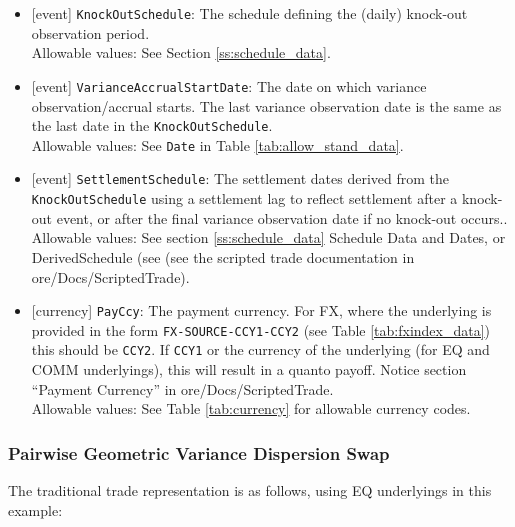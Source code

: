 \begin{itemize}
  The full set of allowable values is given in Table \ref{tab:boolean_allowable}.
  \item{}[event] \lstinline!KnockOutSchedule!: The schedule defining the (daily) knock-out observation period. \\
  Allowable values: See Section \ref{ss:schedule_data}.
  \item{}[event] \lstinline!VarianceAccrualStartDate!: The date on which variance observation/accrual starts. The last variance
  observation date is the same as the last date in the \lstinline!KnockOutSchedule!.  \\
  Allowable values: See \lstinline!Date! in Table \ref{tab:allow_stand_data}.
  \item{}[event] \lstinline!SettlementSchedule!: The settlement dates derived from the \lstinline!KnockOutSchedule! using a
  settlement lag to reflect settlement after a knock-out event, or after the final variance observation date if
  no knock-out occurs.. \\
  Allowable values: See section \ref{ss:schedule_data} Schedule Data and Dates, or DerivedSchedule (see (see the scripted trade
  documentation in ore/Docs/ScriptedTrade).
  \item{}[currency] \lstinline!PayCcy!: The payment currency. For FX, where the underlying is provided
      in the form \lstinline!FX-SOURCE-CCY1-CCY2! (see Table \ref{tab:fxindex_data}) this should
      be \lstinline!CCY2!. If \lstinline!CCY1! or the currency of the underlying (for EQ and
      COMM underlyings), this will result in a quanto payoff. Notice section ``Payment Currency'' in ore/Docs/ScriptedTrade. \\
        Allowable values: See Table \ref{tab:currency} for allowable currency codes.
\end{itemize}

\subsubsection{Pairwise Geometric Variance Dispersion Swap}

The traditional trade representation is as follows, using EQ underlyings in this example:


